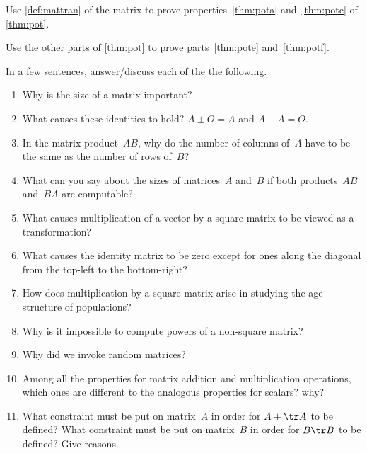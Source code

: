 \begin{exercise} \label{ex:} 
Use \autoref{def:mattran} of the matrix  to prove properties~\ref{thm:pota} and~\ref{thm:potc} of \autoref{thm:pot}.
\end{exercise}

\begin{exercise} \label{ex:} 
Use the other parts of \autoref{thm:pot} to prove parts~\ref{thm:pote} and~\ref{thm:potf}.
\end{exercise}


\begin{exercise} \label{ex:} 
In a few sentences, answer\slash discuss each of the the following.
\begin{enumerate}
\item Why is the size of a matrix important?

\item What causes these identities to hold? \(A\pm O=A\) and \(A-A=O\).

\item In the matrix product~\(AB\), why do the number of columns of~\(A\) have to be the same as the number of rows of~\(B\)?

\item What can you say about the sizes of matrices~\(A\) and~\(B\) if both products~\(AB\) and~\(BA\) are computable?

\item What causes multiplication of a vector by a square matrix to be viewed as a transformation?

\item What causes the identity matrix to be zero except for ones along the diagonal from the top-left to the bottom-right?

\item How does multiplication by a square matrix arise in studying the age structure of populations?

\item Why is it impossible to compute powers of a non-square matrix?

\item Why did we invoke random matrices?

\item Among all the properties for matrix addition and multiplication operations, which ones are different to the analogous properties for scalars?  why?

\item What constraint must be put on matrix~\(A\) in order for \(A+\tr A\) to be defined?  
What constraint must be put on matrix~\(B\) in order for \(B\tr B\) to be defined?  
Give reasons.

\end{enumerate}
\end{exercise}


